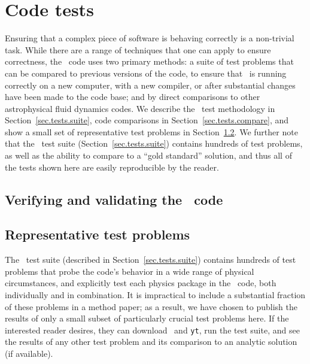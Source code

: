 
\section{Code tests}
\label{sec.tests}

Ensuring that a complex piece of software is behaving correctly is a
non-trivial task.  While there are a range of techniques that one can
apply to ensure correctness, the \enzo\ code uses two primary methods:
a suite of test problems that can be compared to previous versions of
the code, to ensure that \enzo\ is running correctly on a new
computer, with a new compiler, or after substantial changes have been
made to the code base; and by direct comparisons to other
astrophysical fluid dynamics codes.  We describe the \enzo\ test
methodology in Section~\ref{sec.tests.suite}, code comparisons in
Section~\ref{sec.tests.compare}, and show a small set of
representative test problems in Section~\ref{sec.tests.problems}.  We
further note that the \enzo\ test suite
(Section~\ref{sec.tests.suite}) contains hundreds of test problems, as
well as the ability to compare to a ``gold standard'' solution, and
thus all of the tests shown here are easily reproducible by the
reader.

\subsection{Verifying and validating the \enzo\ code}
\label{sec.tests.vandv}



\subsection{Representative test problems}
\label{sec.tests.problems}

The \enzo\ test suite (described in Section~\ref{sec.tests.suite})
contains hundreds of test problems that probe the code's behavior in a
wide range of physical circumstances, and explicitly test each physics
package in the \enzo\ code, both individually and in combination.  It
is impractical to include a substantial fraction of these problems in
a method paper; as a result, we have chosen to publish the results of
only a small subset of particularly crucial test problems here.  If
the interested reader desires, they can download \enzo\ and
\texttt{yt}, run the test suite, and see the results of any other test
problem and its comparison to an analytic solution (if available).

